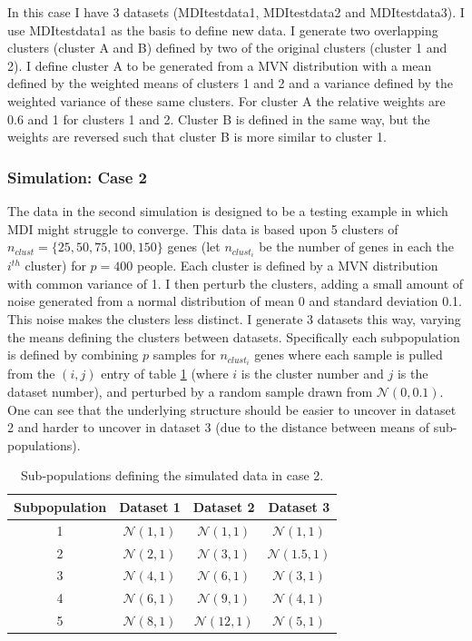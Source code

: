 \documentclass[12pt]{article} %
\begin{document}
	In this case I have 3 datasets (MDItestdata1, MDItestdata2 and MDItestdata3). I use MDItestdata1 as the basis to define new data. I generate two overlapping clusters (cluster A and B) defined by two of the original clusters (cluster  1 and 2). I define cluster A to be generated from a MVN distribution with a mean defined by the weighted means of clusters 1 and 2 and a variance defined by the weighted variance of these same clusters. For cluster A the relative weights are 0.6 and 1 for clusters 1 and 2. Cluster B is defined in the same way, but the weights are reversed such that cluster B is more similar to cluster 1.
	
	\subsubsection{Simulation: Case 2} \label{sec:sim:data:case_2}
	The data in the second simulation is designed to be a testing example in which MDI might struggle to converge. This data is based upon 5 clusters of $n_{clust}=\{25, 50, 75, 100, 150\}$ genes (let $n_{clust_i}$ be the number of genes in each the $i^{th}$ cluster) for $p=400$ people. Each cluster is defined by a MVN distribution with common variance of 1. I then perturb the clusters, adding a small amount of noise generated from a normal distribution of mean 0 and standard deviation 0.1. This noise makes the clusters less distinct. I generate 3 datasets this way, varying the means defining the clusters between datasets. Specifically each subpopulation is defined by combining $p$ samples for $n_{clust_i}$ genes where each sample is pulled from the $(i, j)$ entry of table \ref{table:generated_data_case_2} (where $i$ is the cluster number and $j$ is the dataset number), and perturbed by a random sample drawn from $\mathcal{N}(0,0.1)$. One can see that the underlying structure should be easier to uncover in dataset 2 and harder to uncover in dataset 3 (due to the distance between means of sub-populations).

\begin{table}[!htb] 
	\centering
	\begin{tabular}{c|ccc} 
		Subpopulation	& Dataset 1	& Dataset 2	& Dataset 3	\\ 
		\hline
		1 		& $\mathcal{N}(1,1)$	& $\mathcal{N}(1,1)$ 	& $\mathcal{N}(1,1)$	\\
		2 		& $\mathcal{N}(2,1)$	& $\mathcal{N}(3,1)$ 	& $\mathcal{N}(1.5,1)$	\\
		3 		& $\mathcal{N}(4,1)$	& $\mathcal{N}(6,1)$ 	& $\mathcal{N}(3,1)$	\\
		4 		& $\mathcal{N}(6,1)$	& $\mathcal{N}(9,1)$ 	& $\mathcal{N}(4,1)$	\\
		5 		& $\mathcal{N}(8,1)$	& $\mathcal{N}(12,1)$ 	& $\mathcal{N}(5,1)$	
	\end{tabular}
	\caption{Sub-populations defining the simulated data in case 2.}
	\label{table:generated_data_case_2}
\end{table}
\end{document}
